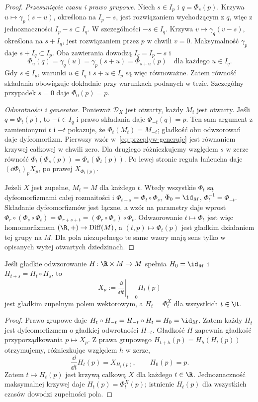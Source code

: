 \begin{proof}
\emph{Przesunięcie czasu i prawo grupowe.}
Niech $s\in I_p$ i $q=\Phi_s(p)$. Krzywa
$u\mapsto\gamma_p(s+u)$, określona na $I_p-s$, jest
rozwiązaniem wychodzącym z $q$, więc z jednoznaczności
$I_p-s\subset I_q$. W szczególności $-s\in I_q$.
Krzywa $v\mapsto\gamma_q(v-s)$, określona na $s+I_q$,
jest rozwiązaniem przez $p$ w chwili $v=0$.
Maksymalność $\gamma_p$ daje $s+I_q\subset I_p$.
Oba zawierania dowodzą $I_q=I_p-s$ i
\[
 \Phi_u(q)=\gamma_q(u)=\gamma_p(s+u)=\Phi_{s+u}(p)
 \quad\text{dla każdego }u\in I_q.
\]
Gdy $s\in I_p$, warunki $u\in I_q$ i $s+u\in I_p$
są więc równoważne. Zatem równość składania
obowiązuje dokładnie przy warunkach podanych w tezie.
Szczególny przypadek $s=0$ daje
$\Phi_0(p)=p$.

\emph{Odwrotności i generator.}
Ponieważ $\mathcal D_X$ jest otwarty, każdy $M_t$ jest otwarty.
Jeśli $q=\Phi_t(p)$, to $-t\in I_q$ i prawo składania
daje $\Phi_{-t}(q)=p$. Ten sam argument z zamienionymi
$t$ i $-t$ pokazuje, że $\Phi_t(M_t)=M_{-t}$;
gładkość obu odwzorowań daje dyfeomorfizm.
Pierwszy wzór w~\eqref{eq:przeplyw-generuje} jest równaniem
krzywej całkowej w chwili zero. Dla drugiego różniczkujemy
względem $s$ w zerze równość
$\Phi_t(\Phi_s(p))=\Phi_s(\Phi_t(p))$.
Po lewej stronie reguła łańcucha daje
$(\dd\Phi_t)_pX_p$, po prawej $X_{\Phi_t(p)}$.

Jeżeli $X$ jest zupełne, $M_t=M$ dla każdego $t$.
Wtedy wszystkie $\Phi_t$ są dyfeomorfizmami całej
rozmaitości i
$\Phi_{t+s}=\Phi_t\circ\Phi_s$, $\Phi_0=\id_M$,
$\Phi_t^{-1}=\Phi_{-t}$. Składanie dyfeomorfizmów
jest łączne, a wzór na parametry daje wprost
$\Phi_r\circ(\Phi_s\circ\Phi_t)=\Phi_{r+s+t}
=(\Phi_r\circ\Phi_s)\circ\Phi_t$.
Odwzorowanie $t\mapsto\Phi_t$ jest więc homomorfizmem
$(\R,+)\to\operatorname{Diff}(M)$, a
$(t,p)\mapsto\Phi_t(p)$ jest gładkim działaniem tej
grupy na $M$. Dla pola niezupełnego te same wzory
mają sens tylko w opisanych wyżej otwartych dziedzinach.
\end{proof}

\begin{stwierdzenie}
Jeśli gładkie odwzorowanie $H\colon\R\times M\to M$ spełnia
$H_0=\id_M$ i $H_{t+s}=H_t\circ H_s$, to
\[
 X_p:=\left.\frac{\dd}{\dd t}\right|_{t=0}H_t(p)
\]
jest gładkim zupełnym polem wektorowym, a $H_t=\Phi_t^X$
dla wszystkich $t\in\R$.
\end{stwierdzenie}
\begin{proof}
Prawo grupowe daje $H_t\circ H_{-t}=H_{-t}\circ H_t
=H_0=\id_M$. Zatem każdy $H_t$ jest dyfeomorfizmem
o gładkiej odwrotności $H_{-t}$.
Gładkość $H$ zapewnia gładkość przyporządkowania $p\mapsto X_p$.
Z prawa grupowego $H_{t+h}(p)=H_h(H_t(p))$ otrzymujemy,
różniczkując względem $h$ w zerze,
\[
 \frac{\dd}{\dd t}H_t(p)=X_{H_t(p)},\qquad H_0(p)=p.
\]
Zatem $t\mapsto H_t(p)$ jest krzywą całkową $X$ dla każdego
$t\in\R$. Jednoznaczność maksymalnej krzywej daje
$H_t(p)=\Phi_t^X(p)$; istnienie $H_t(p)$ dla wszystkich
czasów dowodzi zupełności pola.
\end{proof}


